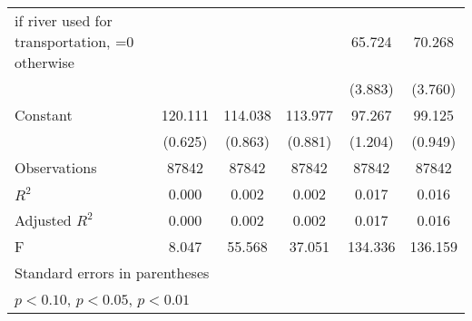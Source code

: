 {\begin{tabular}{l*{5}{c}}
\addlinespace
=1 if river used for transportation, =0 otherwise&                     &                     &                     &      65.724\sym{***}&      70.268\sym{***}\\
                    &                     &                     &                     &     (3.883)         &     (3.760)         \\
\addlinespace
Constant            &     120.111\sym{***}&     114.038\sym{***}&     113.977\sym{***}&      97.267\sym{***}&      99.125\sym{***}\\
                    &     (0.625)         &     (0.863)         &     (0.881)         &     (1.204)         &     (0.949)         \\
\midrule
Observations        &       87842         &       87842         &       87842         &       87842         &       87842         \\
\(R^{2}\)           &       0.000         &       0.002         &       0.002         &       0.017         &       0.016         \\
Adjusted \(R^{2}\)  &       0.000         &       0.002         &       0.002         &       0.017         &       0.016         \\
F                   &       8.047         &      55.568         &      37.051         &     134.336         &     136.159         \\
\bottomrule
\multicolumn{6}{l}{\footnotesize Standard errors in parentheses}\\
\multicolumn{6}{l}{\footnotesize \sym{*} \(p<0.10\), \sym{**} \(p<0.05\), \sym{***} \(p<0.01\)}\\
\end{tabular}
}
